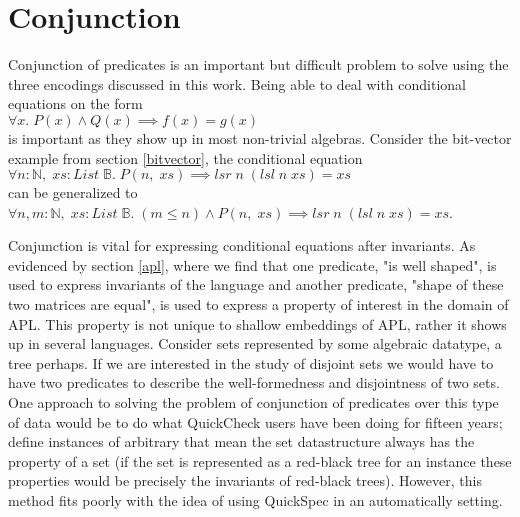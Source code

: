 \section{Conjunction}\label{conjunction}
Conjunction of predicates is an important
but difficult problem to solve using the three
encodings discussed in this work.
Being able to deal with conditional equations on the form
\\$\forall x.\;P(x)\wedge Q(x)\implies f(x)=g(x)$\\
is important as they show up in most non-trivial
algebras. Consider the bit-vector example from section
\ref{bitvector}, the conditional equation
\\$\forall n:\mathbb{N},\;xs:List\;\mathbb{B}.\;P(n,\;xs)\implies lsr\;n\;(lsl\;n\;xs)=xs$\\
can be generalized to
\\$\forall n,m:\mathbb{N},\;xs:List\;\mathbb{B}.\;(m\leq n)\wedge P(n,\;xs)\implies lsr\;n\;(lsl\;n\;xs)=xs$.

Conjunction is vital for expressing conditional equations after invariants.
As evidenced by section \ref{apl}, where we find that one predicate, "is well shaped",
is used to express invariants of the language and another predicate, "shape of these two matrices
are equal", is used to express a property of interest in the domain of APL.
This property is not unique to shallow embeddings of APL, rather it shows up in several languages.
Consider sets represented by some algebraic datatype, a tree perhaps. If we are interested
in the study of disjoint sets we would have to have two predicates to describe the well-formedness
and disjointness of two sets. One approach to solving the problem of conjunction of predicates over this
type of data would be to do what QuickCheck users have been doing for fifteen years; define instances
of arbitrary that mean the set datastructure always has the property of a set (if the set is represented
as a red-black tree for an instance these properties would be precisely the invariants of red-black trees). 
However, this method fits poorly with the idea of using QuickSpec in an automatically setting.

